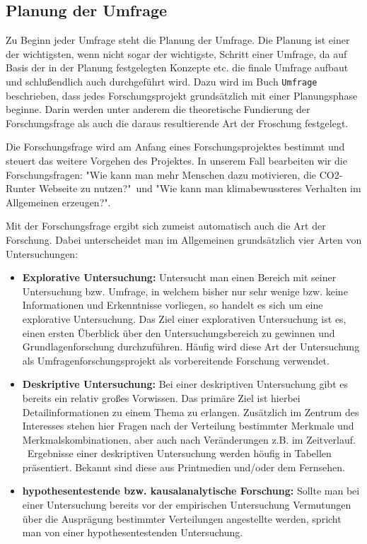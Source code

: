 \subsection{Planung der Umfrage}
Zu Beginn jeder Umfrage steht die Planung der Umfrage.
Die Planung ist einer der wichtigsten, wenn nicht sogar der wichtigste, Schritt einer Umfrage, da auf Basis der in der Planung festgelegten Konzepte etc.
die finale Umfrage aufbaut und schlußendlich auch durchgeführt wird.
Dazu wird im Buch \texttt{Umfrage} beschrieben, dass jedes Forschungsprojekt grundsätzlich mit einer Planungsphase beginne.
Darin werden unter anderem die theoretische Fundierung der Forschungsfrage als auch die daraus resultierende Art der Froschung festgelegt.\cite{umfrage:2011}

Die Forschungsfrage wird am Anfang eines Forschungsprojektes bestimmt und steuert das weitere Vorgehen des Projektes. \cite{umfrage:2011}
In unserem Fall bearbeiten wir die Forschungsfragen: "Wie kann man mehr Menschen dazu motivieren, die CO2-Runter Webseite zu nutzen?"\ und "Wie kann man klimabewussteres Verhalten im Allgemeinen erzeugen?".

Mit der Forschungsfrage ergibt sich zumeist automatisch auch die Art der Forschung.
Dabei unterscheidet man im Allgemeinen grundsätzlich vier Arten von Untersuchungen:

\begin{itemize}
    \item \textbf{Explorative Untersuchung:} Untersucht man einen Bereich mit seiner Untersuchung bzw. Umfrage, in welchem bisher nur sehr wenige bzw. keine Informationen und Erkenntnisse vorliegen, so handelt es sich um eine explorative Untersuchung. Das Ziel einer explorativen Untersuchung ist es, einen ersten Überblick über den Untersuchungsbereich zu gewinnen und Grundlagenforschung durchzuführen. Häufig wird diese Art der Untersuchung als Umfragenforschungsprojekt als vorbereitende Forschung verwendet. \cite{umfrage:2011}
    \item \textbf{Deskriptive Untersuchung:} Bei einer deskriptiven Untersuchung gibt es bereits ein relativ großes Vorwissen. Das primäre Ziel ist hierbei Detailinformationen zu einem Thema zu erlangen. Zusätzlich im Zentrum des Interesses stehen hier Fragen nach der Verteilung bestimmter Merkmale und Merkmalskombinationen, aber auch nach Veränderungen z.B. im Zeitverlauf. \cite{umfrage:2011}\ Ergebnisse einer deskriptiven Untersuchung werden höufig in Tabellen präsentiert. Bekannt sind diese aus Printmedien und/oder dem Fernsehen.\cite{umfrage:2011}
    \item \textbf{hypothesentestende bzw. kausalanalytische Forschung:} Sollte man bei einer Untersuchung bereits vor der empirischen Untersuchung Vermutungen über die Ausprägung bestimmter Verteilungen angestellte werden, spricht man von einer hypothesentestenden Untersuchung.\cite{umfrage:2011}
\end{itemize}

